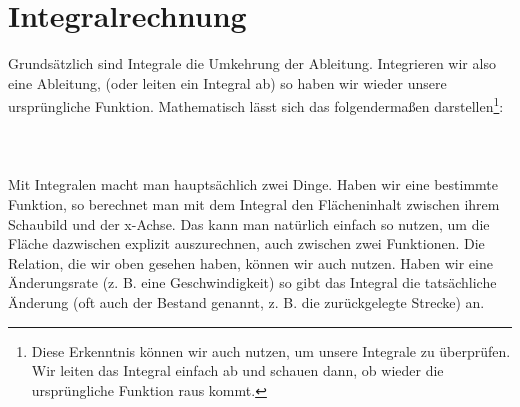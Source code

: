 \section{Integralrechnung}
	Grundsätzlich sind Integrale die Umkehrung der Ableitung. Integrieren wir also
	eine Ableitung, (oder leiten ein Integral ab) so haben wir wieder unsere
	ursprüngliche Funktion. Mathematisch lässt sich das folgendermaßen
	darstellen\footnote{Diese Erkenntnis können wir auch nutzen, um unsere
	Integrale zu überprüfen. Wir leiten das Integral einfach ab und schauen dann,
	ob wieder die ursprüngliche Funktion raus kommt.}:
	\\ \\
	\formel{\[\int f'(x)\ dx=f(x)\]}
	\\ \\
	Mit Integralen macht man hauptsächlich zwei Dinge. Haben wir eine bestimmte
	Funktion, so berechnet man mit dem Integral den Flächeninhalt zwischen ihrem
	Schaubild und der x-Achse. Das kann man natürlich einfach so nutzen, um die
	Fläche dazwischen explizit auszurechnen, auch zwischen zwei Funktionen. Die
	Relation, die wir oben gesehen haben, können wir auch nutzen. Haben wir eine
	Änderungsrate (z. B. eine Geschwindigkeit) so gibt das Integral die
	tatsächliche Änderung (oft auch der Bestand genannt, z. B. die zurückgelegte
	Strecke) an.
	

	

	

	

	

	
